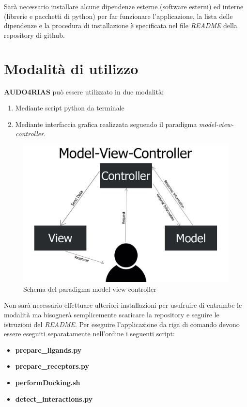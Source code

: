 Sarà necessario installare alcune dipendenze esterne (software esterni) ed interne (librerie e pacchetti di python) per far funzionare l'applicazione, la lista delle dipendenze e la procedura di installazione è specificata nel file \textit{README} della repository di github.

\section{Modalità di utilizzo}
\textbf{AUDO4RIAS} può essere utilizzato in due modalità:

\begin{enumerate}[label=\arabic{*}., ref=(\arabic{*})]
    \item Mediante script python da terminale
    \item Mediante interfaccia grafica realizzata seguendo il paradigma \textit{model-view-controller}.
\end{enumerate}

\begin{figure}[H]
    \centering
    \includegraphics[scale=0.4]{immagini/capitolo3/model-view-controller.jpg}
    \caption{Schema del paradigma model-view-controller}
    \label{fig:model-view-controller}
\end{figure}

Non sarà necessario effettuare ulteriori installazioni per usufruire di entrambe le modalità ma bisognerà semplicemente scaricare la repository e seguire le istruzioni del \textit{README}.\newline
Per eseguire l'applicazione da riga di comando devono essere eseguiti separatamente nell'ordine i seguenti script:

\begin{itemize}
    \item \textbf{prepare\_ligands.py}
    \item \textbf{prepare\_receptors.py}
    \item \textbf{performDocking.sh}
    \item \textbf{detect\_interactions.py}
\end{itemize}

